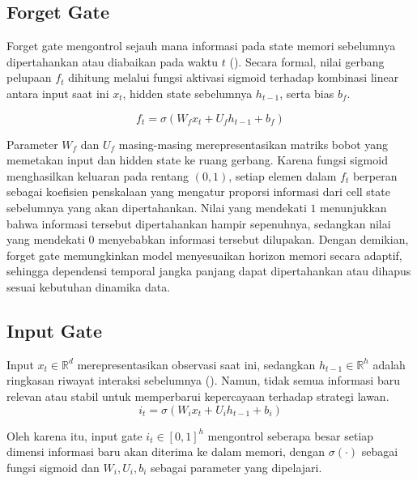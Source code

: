 \subsection{Forget Gate}

Forget gate mengontrol sejauh mana informasi pada state memori sebelumnya dipertahankan atau diabaikan pada waktu $t$ (\cite{hochreiter_long_1997}). Secara formal, nilai gerbang pelupaan $f_t$ dihitung melalui fungsi aktivasi sigmoid terhadap kombinasi linear antara input saat ini $x_t$, hidden state sebelumnya $h_{t-1}$, serta bias $b_f$. 

\begin{equation}
f_t = \sigma(W_f x_t + U_f h_{t-1} + b_f)
\end{equation}

\noindent
Parameter $W_f$ dan $U_f$ masing-masing merepresentasikan matriks bobot yang memetakan input dan hidden state ke ruang gerbang. Karena fungsi sigmoid menghasilkan keluaran pada rentang $(0,1)$, setiap elemen dalam $f_t$ berperan sebagai koefisien penskalaan yang mengatur proporsi informasi dari cell state sebelumnya yang akan dipertahankan. Nilai yang mendekati $1$ menunjukkan bahwa informasi tersebut dipertahankan hampir sepenuhnya, sedangkan nilai yang mendekati $0$ menyebabkan informasi tersebut dilupakan. Dengan demikian, forget gate memungkinkan model menyesuaikan horizon memori secara adaptif, sehingga dependensi temporal jangka panjang dapat dipertahankan atau dihapus sesuai kebutuhan dinamika data.


\subsection{Input Gate}

Input $x_t \in \mathbb{R}^d$ merepresentasikan observasi saat ini, sedangkan $h_{t-1} \in \mathbb{R}^h$ adalah ringkasan riwayat interaksi sebelumnya (\cite{hochreiter_long_1997}). Namun, tidak semua informasi baru relevan atau stabil untuk memperbarui kepercayaan terhadap strategi lawan.
\begin{equation}
i_t = \sigma(W_i x_t + U_i h_{t-1} + b_i)
\end{equation}

\noindent
Oleh karena itu, input gate $i_t \in [0,1]^h$ mengontrol seberapa besar setiap dimensi informasi baru akan diterima ke dalam memori, dengan $\sigma(\cdot)$ sebagai fungsi sigmoid dan $W_i, U_i, b_i$ sebagai parameter yang dipelajari.



